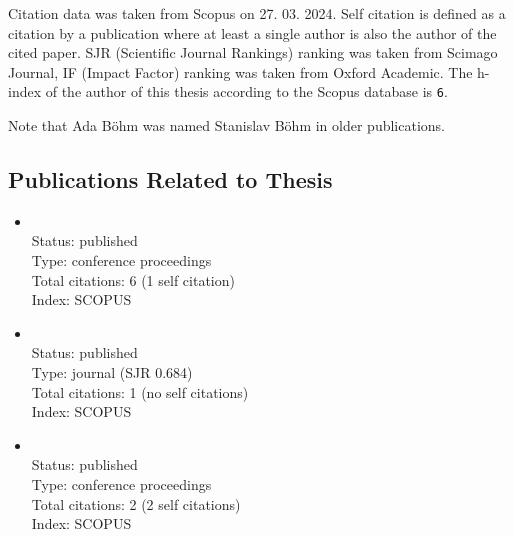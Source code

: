 Citation data was taken from Scopus on 27. 03. 2024.
Self citation is defined as a citation by a publication where at least a single author is also the
author of the cited paper. SJR (Scientific Journal Rankings) ranking was taken from Scimago Journal,
IF (Impact Factor) ranking was taken from Oxford Academic.
The h-index of the author of this thesis according to the Scopus database is \texttt{6}.

Note that Ada Böhm was named Stanislav Böhm in older publications.

\begin{refsection}
\section*{Publications Related to Thesis}
    \begin{itemize}
		\item{}\vspace{2mm}\\Status: published\\Type: conference proceedings\\Total citations: 6 (1 self citation)\\Index: SCOPUS
		\item{}\vspace{2mm}\\Status: published\\Type: journal (SJR 0.684)\\Total citations: 1 (no self citations)\\Index: SCOPUS
		\item{}\vspace{2mm}\\Status: published\\Type: conference proceedings\\Total citations: 2 (2 self citations)\\Index: SCOPUS
\end{itemize}

\newpage

\end{refsection}
